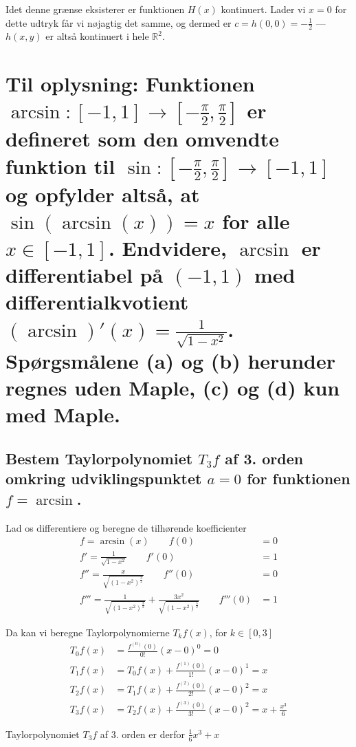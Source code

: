 \documentclass[11pt,a4paper]{article}
\begin{document}
Idet denne grænse eksisterer er funktionen $H(x)$ kontinuert. Lader vi
$x = 0$ for dette udtryk får vi nøjagtig det samme, og dermed er $c = h(0,0)
= -\frac{1}{2}$ --- $h(x,y)$ er altså kontinuert i hele $\mathbb{R}^2$.

\section
{
    \mdseries
    Til oplysning: Funktionen $\arcsin : [-1,1] \rightarrow [-\frac{\pi}{2},
    \frac{\pi}{2}]$ er defineret som den omvendte funktion til $\sin :
    [-\frac{\pi}{2}, \frac{\pi}{2}] \rightarrow [-1,1]$ og opfylder altså, at
    $\sin(\arcsin(x)) = x$ for alle $x \in [-1,1]$. Endvidere, $\arcsin$ er
    differentiabel på $(-1,1)$ med differentialkvotient $(\arcsin)'(x) =
    \frac{1}{\sqrt{1 - x^2}}$. Spørgsmålene (a) og (b) herunder regnes uden
    Maple, (c) og (d) kun med Maple.
}

\subsection
{
    \mdseries
    Bestem Taylorpolynomiet $T_3 f$ af 3. orden omkring udviklingspunktet
    $a = 0$ for funktionen $f = \arcsin$.
}
Lad os differentiere og beregne de tilhørende koefficienter
\begin{align}
    f = \arcsin(x) \qquad f(0) &= 0 \\
    f' = \frac{1}{\sqrt{1 - x^2}} \qquad f'(0) &= 1 \\
    f'' = \frac{x}{\sqrt{(1 - x^2)^{\frac{3}{2}}}} \qquad f''(0) &= 0 \\
    f''' = \frac{1}{\sqrt{(1 - x^2)^{\frac{3}{2}}}} +
           \frac{3x^2}{\sqrt{(1 - x^2)^{\frac{5}{2}}}} \qquad f'''(0) &= 1
\end{align}

Da kan vi beregne Taylorpolynomierne $T_k f(x)$, for $k \in [0,3]$
\begin{align}
    T_0 f(x) &= \frac{f^{(0)}(0)}{0!} (x - 0)^0 = 0 \\
    T_1 f(x) &= T_0 f(x) + \frac{f^{(1)}(0)}{1!} (x - 0)^1 = x \\
    T_2 f(x) &= T_1 f(x) + \frac{f^{(2)}(0)}{2!} (x - 0)^2 = x \\
    T_3 f(x) &= T_2 f(x) + \frac{f^{(3)}(0)}{3!} (x - 0)^2
              = x + \frac{x^3}{6}
\end{align}

Taylorpolynomiet $T_3 f$ af 3. orden er derfor $\frac{1}{6}x^3 + x$
\end{document}

